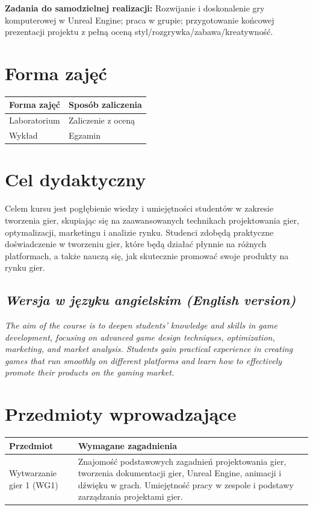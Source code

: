 \documentclass[12pt, a4paper]{article}
\begin{document}
\vspace{4pt}
\noindent\textbf{Zadania do samodzielnej realizacji:} Rozwijanie i doskonalenie gry komputerowej w Unreal Engine; praca w grupie; przygotowanie końcowej prezentacji projektu z pełną oceną styl/rozgrywka/zabawa/kreatywność.

\section{Forma zajęć}

\begin{tabular}{ll}
  \hline
  \textbf{Forma zajęć} & \textbf{Sposób zaliczenia} \\
  \hline
  Laboratorium & Zaliczenie z oceną \\
  Wykład & Egzamin \\
  \hline
\end{tabular}

\section{Cel dydaktyczny}

Celem kursu jest pogłębienie wiedzy i umiejętności studentów w zakresie tworzenia gier, skupiając się na zaawansowanych technikach projektowania gier, optymalizacji, marketingu i analizie rynku. Studenci zdobędą praktyczne doświadczenie w tworzeniu gier, które będą działać płynnie na różnych platformach, a także nauczą się, jak skutecznie promować swoje produkty na rynku gier.

\subsection*{\textit{Wersja w języku angielskim (English version)}}

\textit{The aim of the course is to deepen students’ knowledge and skills in game development, focusing on advanced game design techniques, optimization, marketing, and market analysis. Students gain practical experience in creating games that run smoothly on different platforms and learn how to effectively promote their products on the gaming market.}


\section{Przedmioty wprowadzające}

\begin{tabularx}{\textwidth}{lX}
  \hline
  \textbf{Przedmiot} & \textbf{Wymagane zagadnienia} \\
  \hline
  Wytwarzanie gier 1 (WG1) & Znajomość podstawowych zagadnień projektowania gier, tworzenia dokumentacji gier, Unreal Engine, animacji i dźwięku w grach. Umiejętność pracy w zespole i podstawy zarządzania projektami gier. \\
  \hline
\end{tabularx}
\end{document}
